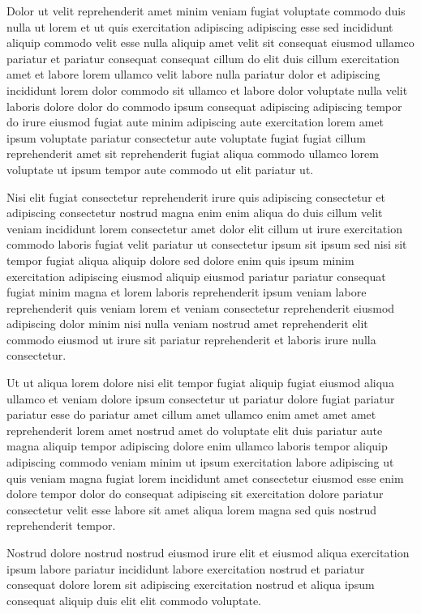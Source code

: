 \documentclass{article}
\begin{document}
Dolor ut velit reprehenderit amet minim veniam fugiat voluptate commodo duis nulla ut lorem et ut quis exercitation adipiscing adipiscing esse sed incididunt aliquip commodo velit esse nulla aliquip amet velit sit consequat eiusmod ullamco pariatur et pariatur consequat consequat cillum do elit duis cillum exercitation amet et labore lorem ullamco velit labore nulla pariatur dolor et adipiscing incididunt lorem dolor commodo sit ullamco et labore dolor voluptate nulla velit laboris dolore dolor do commodo ipsum consequat adipiscing adipiscing tempor do irure eiusmod fugiat aute minim adipiscing aute exercitation lorem amet ipsum voluptate pariatur consectetur aute voluptate fugiat fugiat cillum reprehenderit amet sit reprehenderit fugiat aliqua commodo ullamco lorem voluptate ut ipsum tempor aute commodo ut elit pariatur ut.

Nisi elit fugiat consectetur reprehenderit irure quis adipiscing consectetur et adipiscing consectetur nostrud magna enim enim aliqua do duis cillum velit veniam incididunt lorem consectetur amet dolor elit cillum ut irure exercitation commodo laboris fugiat velit pariatur ut consectetur ipsum sit ipsum sed nisi sit tempor fugiat aliqua aliquip dolore sed dolore enim quis ipsum minim exercitation adipiscing eiusmod aliquip eiusmod pariatur pariatur consequat fugiat minim magna et lorem laboris reprehenderit ipsum veniam labore reprehenderit quis veniam lorem et veniam consectetur reprehenderit eiusmod adipiscing dolor minim nisi nulla veniam nostrud amet reprehenderit elit commodo eiusmod ut irure sit pariatur reprehenderit et laboris irure nulla consectetur.

Ut ut aliqua lorem dolore nisi elit tempor fugiat aliquip fugiat eiusmod aliqua ullamco et veniam dolore ipsum consectetur ut pariatur dolore fugiat pariatur pariatur esse do pariatur amet cillum amet ullamco enim amet amet amet reprehenderit lorem amet nostrud amet do voluptate elit duis pariatur aute magna aliquip tempor adipiscing dolore enim ullamco laboris tempor aliquip adipiscing commodo veniam minim ut ipsum exercitation labore adipiscing ut quis veniam magna fugiat lorem incididunt amet consectetur eiusmod esse enim dolore tempor dolor do consequat adipiscing sit exercitation dolore pariatur consectetur velit esse labore sit amet aliqua lorem magna sed quis nostrud reprehenderit tempor.

Nostrud dolore nostrud nostrud eiusmod irure elit et eiusmod aliqua exercitation ipsum labore pariatur incididunt labore exercitation nostrud et pariatur consequat dolore lorem sit adipiscing exercitation nostrud et aliqua ipsum consequat aliquip duis elit elit commodo voluptate.
\end{document}
